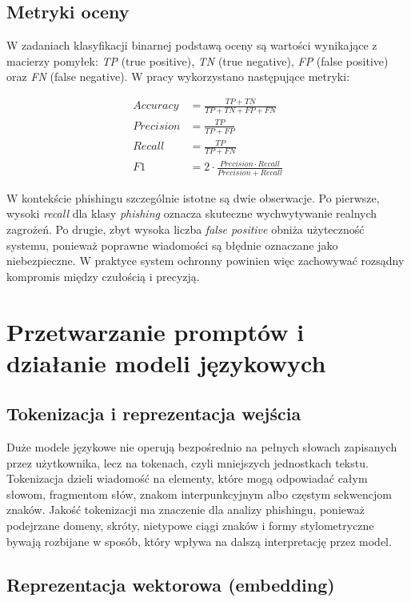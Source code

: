 \documentclass[12pt,a4paper,openright]{report}
\begin{document}
\section{Metryki oceny}

W zadaniach klasyfikacji binarnej podstawą oceny są wartości wynikające z macierzy pomyłek: \textit{TP} (true positive), \textit{TN} (true negative), \textit{FP} (false positive) oraz \textit{FN} (false negative). W pracy wykorzystano następujące metryki:

\begin{align*}
Accuracy &= \frac{TP + TN}{TP + TN + FP + FN} \\
Precision &= \frac{TP}{TP + FP} \\
Recall &= \frac{TP}{TP + FN} \\
F1 &= 2 \cdot \frac{Precision \cdot Recall}{Precision + Recall}
\end{align*}

W kontekście phishingu szczególnie istotne są dwie obserwacje. Po pierwsze, wysoki \textit{recall} dla klasy \textit{phishing} oznacza skuteczne wychwytywanie realnych zagrożeń. Po drugie, zbyt wysoka liczba \textit{false positive} obniża użyteczność systemu, ponieważ poprawne wiadomości są błędnie oznaczane jako niebezpieczne. W praktyce system ochronny powinien więc zachowywać rozsądny kompromis między czułością i precyzją.

\chapter{Przetwarzanie promptów i działanie modeli językowych}

\section{Tokenizacja i reprezentacja wejścia}

Duże modele językowe nie operują bezpośrednio na pełnych słowach zapisanych przez użytkownika, lecz na tokenach, czyli mniejszych jednostkach tekstu. Tokenizacja dzieli wiadomość na elementy, które mogą odpowiadać całym słowom, fragmentom słów, znakom interpunkcyjnym albo częstym sekwencjom znaków. Jakość tokenizacji ma znaczenie dla analizy phishingu, ponieważ podejrzane domeny, skróty, nietypowe ciągi znaków i formy stylometryczne bywają rozbijane w sposób, który wpływa na dalszą interpretację przez model.

\section{Reprezentacja wektorowa (embedding)}
\end{document}
